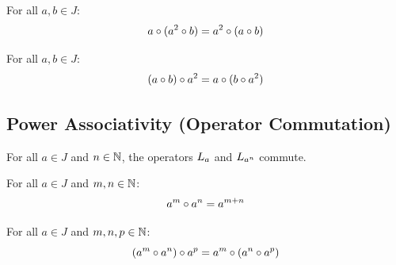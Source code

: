 \begin{theorem}
For all $a, b \in J$:
\[
a \circ (a^{2} \circ b) = a^{2} \circ (a \circ b)
\]
\end{theorem}

\begin{theorem}
For all $a, b \in J$:
\[
(a \circ b) \circ a^{2} = a \circ (b \circ a^{2})
\]
\end{theorem}

\subsection{Power Associativity (Operator Commutation)}

\begin{theorem}
For all $a \in J$ and $n \in \mathbb{N}$, the operators $L_{a}$ and $L_{a^{n}}$ commute.
\end{theorem}

\begin{theorem}
For all $a \in J$ and $m, n \in \mathbb{N}$:
\[
a^{m} \circ a^{n} = a^{m+n}
\]
\end{theorem}

\begin{theorem}
For all $a \in J$ and $m, n, p \in \mathbb{N}$:
\[
(a^{m} \circ a^{n}) \circ a^{p} = a^{m} \circ (a^{n} \circ a^{p})
\]
\end{theorem}
